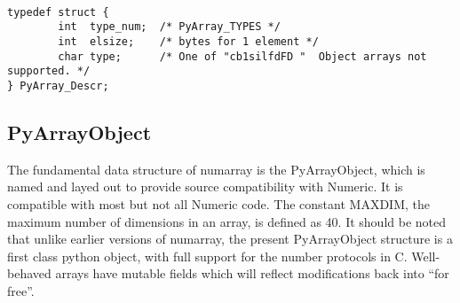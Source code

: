\begin{verbatim}

typedef struct {
        int  type_num;  /* PyArray_TYPES */
        int  elsize;    /* bytes for 1 element */
        char type;      /* One of "cb1silfdFD "  Object arrays not supported. */
} PyArray_Descr;

\end{verbatim}

\subsection{PyArrayObject}

The fundamental data structure of numarray is the PyArrayObject, which is named
and layed out to provide source compatibility with Numeric.  It is compatible
with most but not all Numeric code.  The constant MAXDIM, the maximum number of
dimensions in an array, is defined as 40.  It should be noted that unlike
earlier versions of numarray, the present PyArrayObject structure is a first
class python object, with full support for the number protocols in C.
Well-behaved arrays have mutable fields which will reflect modifications back
into \python ``for free''.

